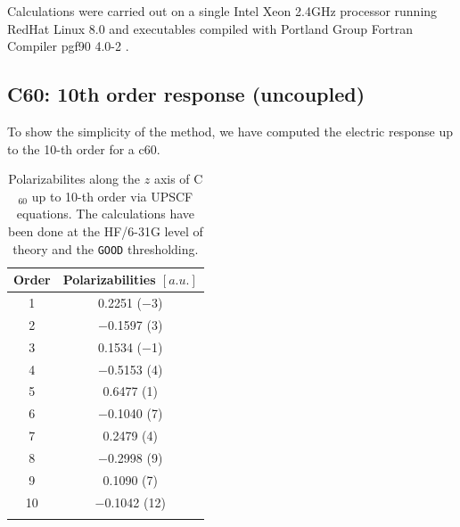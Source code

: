 \documentclass[prl,aps,twocolumn,showpacs,twocolumngrid,superbib]{revtex4}
\begin{document}
Calculations were carried out on a single Intel Xeon 2.4GHz processor 
running RedHat Linux 8.0 and  executables compiled
with Portland Group Fortran Compiler pgf90 4.0-2 \cite{PGF90}.



\subsection{C60: 10th order response (uncoupled)}




To show the simplicity of the method, we have computed 
the electric response up to the 10-th order for a c60.

\begin{table}[t]
  \centering
  \caption{\protect
    Polarizabilites along the $z$ axis of C$_{60}$ up to 10-th order via UPSCF equations.
    The calculations have been done at the HF/6-31G level of 
    theory and the {\tt GOOD} thresholding.
  }\label{tab:C60_Values}
  \begin{tabular}{cc}
    \toprule
    Order & Polarizabilities $[a.u.]$\\
    \hline
     1 &    0.2251 ($-$3)\\
     2 & $-$0.1597 (3)   \\
     3 &    0.1534 ($-$1)\\
     4 & $-$0.5153 (4)   \\
     5 &    0.6477 (1)   \\
     6 & $-$0.1040 (7)   \\
     7 &    0.2479 (4)   \\
     8 & $-$0.2998 (9)   \\
     9 &    0.1090 (7)   \\
    10 & $-$0.1042 (12)  \\
    \botrule
  \end{tabular}
\end{table}
\end{document}
